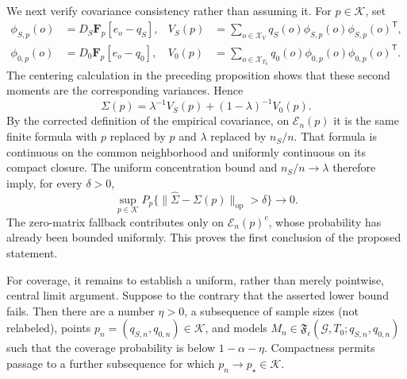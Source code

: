 We next verify covariance consistency rather than assuming it.  For \(p\in\mathcal K\), set
\[
\begin{aligned}
\phi_{S,p}(o)&=D_S\mathbf F_p[e_o-q_S],
&V_S(p)&=\sum_{o\in\mathcal X_V}q_S(o)\phi_{S,p}(o)\phi_{S,p}(o)^{\mathsf T},\\
\phi_{0,p}(o)&=D_0\mathbf F_p[e_o-q_0],
&V_0(p)&=\sum_{o\in\mathcal X_{T_0}}q_0(o)\phi_{0,p}(o)\phi_{0,p}(o)^{\mathsf T}.
\end{aligned}
\]
The centering calculation in the preceding proposition shows that these second moments are the corresponding variances.  Hence
\[
\Sigma(p)=\lambda^{-1}V_S(p)+(1-\lambda)^{-1}V_0(p).
\]
By the corrected definition of the empirical covariance, on \(\mathcal E_n(p)\) it is the same finite formula with \(p\) replaced by \(\widehat p\) and \(\lambda\) replaced by \(n_S/n\).  That formula is continuous on the common neighborhood and uniformly continuous on its compact closure.  The uniform concentration bound and \(n_S/n\to\lambda\) therefore imply, for every \(\delta>0\),
\[
\sup_{p\in\mathcal K}P_p\{\|\widehat\Sigma-\Sigma(p)\|_{\mathrm{op}}>\delta\}\longrightarrow0.
\]
The zero-matrix fallback contributes only on \(\mathcal E_n(p)^c\), whose probability has already been bounded uniformly.  This proves the first conclusion of the proposed statement.

For coverage, it remains to establish a uniform, rather than merely pointwise, central limit argument.  Suppose to the contrary that the asserted lower bound fails.  Then there are a number \(\eta>0\), a subsequence of sample sizes (not relabeled), points \(p_n=(q_{S,n},q_{0,n})\in\mathcal K\), and models \(M_n\in\mathfrak F_{\epsilon}(\mathcal G,T_0;q_{S,n},q_{0,n})\) such that the coverage probability is below \(1-\alpha-\eta\).  Compactness permits passage to a further subsequence for which \(p_n\to p_\star\in\mathcal K\).

